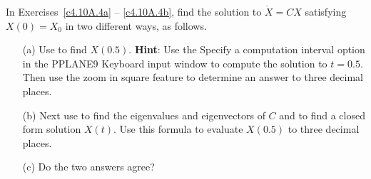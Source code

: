 \documentclass{ximera}
\begin{document}
\noindent In Exercises~\ref{c4.10A.4a} -- \ref{c4.10A.4b}, find the solution 
to $\dot{X} = CX$ satisfying $X(0)=X_0$ in two different ways, as follows.  
\begin{itemize}
\item[(a)]  Use {\pplane} to find $X(0.5)$.  {\bf Hint}: Use the 
{\sf Specify a computation interval} option in the {\sf PPLANE9 Keyboard input} 
window to compute the solution to $t=0.5$. Then use the {\sf zoom in square} 
feature to determine an answer to three decimal places.  
\item[(b)]  Next use \Matlab to find the eigenvalues and eigenvectors of $C$ 
and to find a closed form solution $X(t)$.  Use this formula to evaluate 
$X(0.5)$ to three decimal places.    
\item[(c)]  Do the two answers agree?
\end{itemize}
\end{document}
